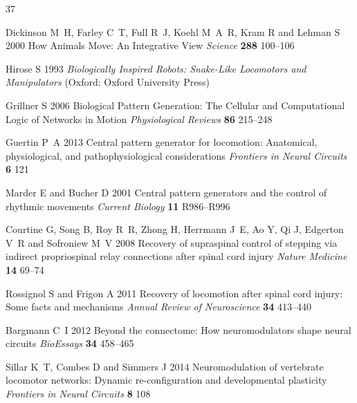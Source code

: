 \documentclass{iopjournal}
\begin{document}


\begin{thebibliography}{37}
\setlength{\itemsep}{0.2pt}
\setlength{\parskip}{0pt}
\small

Dickinson M~H, Farley C~T, Full R~J, Koehl M~A~R, Kram R and Lehman S 2000 How Animals Move: An Integrative View {\em Science\/} {\bf 288} 100--106

Hirose S 1993 {\em Biologically Inspired Robots: Snake-Like Locomotors and Manipulators\/} (Oxford: Oxford University Press)

Grillner S 2006 Biological Pattern Generation: The Cellular and Computational Logic of Networks in Motion {\em Physiological Reviews\/} {\bf 86} 215--248

Guertin P~A 2013 Central pattern generator for locomotion: Anatomical, physiological, and pathophysiological considerations {\em Frontiers in Neural Circuits\/} {\bf 6} 121

Marder E and Bucher D 2001 Central pattern generators and the control of rhythmic movements {\em Current Biology\/} {\bf 11} R986--R996

Courtine G, Song B, Roy R~R, Zhong H, Herrmann J~E, Ao Y, Qi J, Edgerton V~R and Sofroniew M~V 2008 Recovery of supraspinal control of stepping via indirect propriospinal relay connections after spinal cord injury {\em Nature Medicine\/} {\bf 14} 69--74

Rossignol S and Frigon A 2011 Recovery of locomotion after spinal cord injury: Some facts and mechanisms {\em Annual Review of Neuroscience\/} {\bf 34} 413--440

Bargmann C~I 2012 Beyond the connectome: How neuromodulators shape neural circuits {\em BioEssays\/} {\bf 34} 458--465

Sillar K~T, Combes D and Simmers J 2014 Neuromodulation of vertebrate locomotor networks: Dynamic re-configuration and developmental plasticity {\em Frontiers in Neural Circuits\/} {\bf 8} 108


\end{thebibliography}
\end{document}
